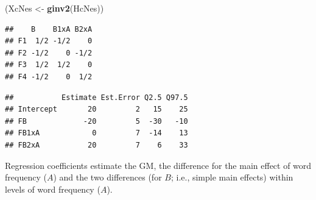 \documentclass[12pt,]{krantz}
\newenvironment{Shaded}{\begin{snugshade}}{\end{snugshade}}
\newcommand{\DataTypeTok}[1]{\textcolor[rgb]{0.13,0.29,0.53}{#1}}
\newcommand{\DecValTok}[1]{\textcolor[rgb]{0.00,0.00,0.81}{#1}}
\newcommand{\KeywordTok}[1]{\textcolor[rgb]{0.13,0.29,0.53}{\textbf{#1}}}
\newcommand{\NormalTok}[1]{#1}
\newcommand{\OperatorTok}[1]{\textcolor[rgb]{0.81,0.36,0.00}{\textbf{#1}}}
\newcommand{\StringTok}[1]{\textcolor[rgb]{0.31,0.60,0.02}{#1}}
\theoremstyle{definition}
\theoremstyle{definition}
\theoremstyle{definition}
\theoremstyle{remark}
\begin{document}
\begin{Shaded}
\begin{Highlighting}[]
\NormalTok{(XcNes <-}\StringTok{ }\KeywordTok{ginv2}\NormalTok{(HcNes))}
\end{Highlighting}
\end{Shaded}

\begin{verbatim}
##    B    B1xA B2xA
## F1  1/2 -1/2    0
## F2 -1/2    0 -1/2
## F3  1/2  1/2    0
## F4 -1/2    0  1/2
\end{verbatim}

\begin{Shaded}
\end{Shaded}

\begin{verbatim}
##           Estimate Est.Error Q2.5 Q97.5
## Intercept       20         2   15    25
## FB             -20         5  -30   -10
## FB1xA            0         7  -14    13
## FB2xA           20         7    6    33
\end{verbatim}

Regression coefficients estimate the GM, the difference for the main effect of word frequency (\(A\)) and the two differences (for \(B\); i.e., simple main effects) within levels of word frequency (\(A\)).
\end{document}
